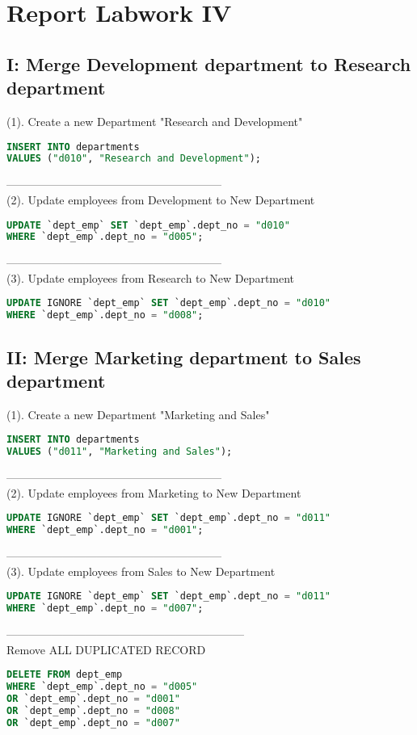 \documentclass[12pt]{report}
\begin{document}
\section*{Report Labwork IV}

\subsection*{I: Merge Development department to Research department}

(1). Create a new Department "Research and Development"
\begin{lstlisting}[language=sql]
INSERT INTO departments 
VALUES ("d010", "Research and Development");
\end{lstlisting}
---------------------------------------------------------
\\
(2). Update employees from Development to New Department
\begin{lstlisting}[language=sql]
UPDATE `dept_emp` SET `dept_emp`.dept_no = "d010" 
WHERE `dept_emp`.dept_no = "d005";
\end{lstlisting}
---------------------------------------------------------
\\
(3). Update employees from Research to New Department
\begin{lstlisting}[language=sql]
UPDATE IGNORE `dept_emp` SET `dept_emp`.dept_no = "d010" 
WHERE `dept_emp`.dept_no = "d008";
\end{lstlisting}


\subsection*{II: Merge Marketing department to Sales department}

(1). Create a new Department "Marketing and Sales"
\begin{lstlisting}[language=sql]
INSERT INTO departments 
VALUES ("d011", "Marketing and Sales");
\end{lstlisting}
---------------------------------------------------------
\\
(2). Update employees from Marketing to New Department
\begin{lstlisting}[language=sql]
UPDATE IGNORE `dept_emp` SET `dept_emp`.dept_no = "d011" 
WHERE `dept_emp`.dept_no = "d001";
\end{lstlisting}
---------------------------------------------------------
\\
(3). Update employees from Sales to New Department
\begin{lstlisting}[language=sql]
UPDATE IGNORE `dept_emp` SET `dept_emp`.dept_no = "d011" 
WHERE `dept_emp`.dept_no = "d007";
\end{lstlisting}


---------------------------------------------------------------
\\
Remove ALL DUPLICATED RECORD
\begin{lstlisting}[language=sql]
DELETE FROM dept_emp 
WHERE `dept_emp`.dept_no = "d005" 
OR `dept_emp`.dept_no = "d001" 
OR `dept_emp`.dept_no = "d008" 
OR `dept_emp`.dept_no = "d007" 
\end{lstlisting}
\end{document}
